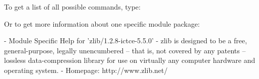 To get a list of all possible commands, type:

\begin{prompt}
\end{prompt}
Or to get more information about one specific module package:

\begin{prompt}
- Module Specific Help for 'zlib/1.2.8-ictce-5.5.0' -
zlib is designed to be a free, general-purpose, legally unencumbered -- that is, not covered by any patents -- lossless data-compression library for use on virtually any computer hardware and operating system. -
Homepage: http://www.zlib.net/
\end{prompt}
